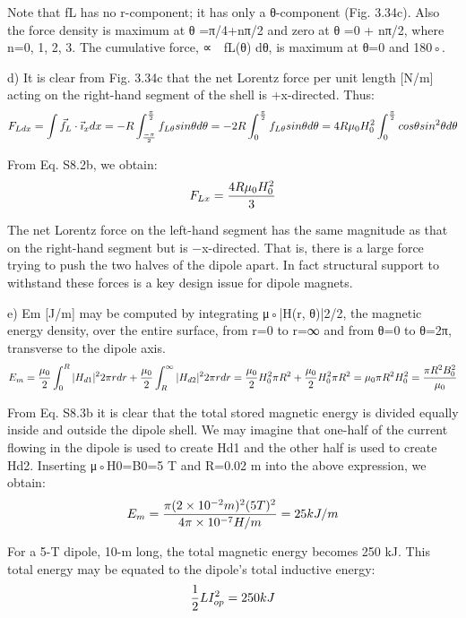 Note that fL has no r-component; it has only a θ-component (Fig. 3.34c). Also
the force density is maximum at θ =π/4+nπ/2 and zero at θ =0 + nπ/2, where
n=0, 1, 2, 3. The cumulative force, ∝  fL(θ) dθ, is maximum at θ=0 and 180◦.

d) It is clear from Fig. 3.34c that the net Lorentz force per unit length [N/m]
acting on the right-hand segment of the shell is +x-directed. Thus:
$$
F_{Ldx}=\int\vec{f}_{L}\cdot\vec{\imath}_{x}dx=-R\int_{\frac{-\pi}{2}}^{\frac{\pi}{2}}f_{L\theta}sin\theta d\theta\\%
=-2R\int_{0}^{\frac{\pi}{2}}f_{L\theta}sin\theta d\theta=4R\mu_{0}H_{0}^{2}\int_{0}^{\frac{\pi}{2}}cos\theta sin^{2}\theta d\theta\\%
$$

From Eq. S8.2b, we obtain:
$$
F_{Lx}=\frac{4R\mu_{0}H_{0}^{2}}{3}\\%
$$

The net Lorentz force on the left-hand segment has the same magnitude as that
on the right-hand segment but is −x-directed. That is, there is a large force trying
to push the two halves of the dipole apart. In fact structural support to withstand
these forces is a key design issue for dipole magnets.

e) Em [J/m] may be computed by integrating μ◦|H(r, θ)|2/2, the magnetic energy density, over the entire surface, from r=0 to r=∞ and from θ=0 to θ=2π,
transverse to the dipole axis.
$$
E_{m}=\frac{\mu_{0}}{2}\int_{0}^{R}|H_{d1}|^{2}2\pi rdr+\frac{\mu_{0}}{2}\int_{R}^{\infty}|H_{d2}|^{2}2\pi rdr\\%
=\frac{\mu_{0}}{2}H_{0}^{2}\pi R^{2}+\frac{\mu_{0}}{2}H_{0}^{2}\pi R^{2}\\%
=\mu_{0}\pi R^{2}H_{0}^{2}=\frac{\pi R^{2}B_{0}^{2}}{\mu_{0}}\\%
$$

From Eq. S8.3b it is clear that the total stored magnetic energy is divided equally
inside and outside the dipole shell. We may imagine that one-half of the current
flowing in the dipole is used to create Hd1 and the other half is used to create Hd2.
Inserting μ◦H0=B0=5 T and R=0.02 m into the above expression, we obtain:
$$
E_{m}=\frac{\pi(2\times 10^{-2}m)^{2}(5T)^{2}}{4\pi\times10^{-7}H/m}=25kJ/m\\
$$

For a 5-T dipole, 10-m long, the total magnetic energy becomes 250 kJ. This total
energy may be equated to the dipole’s total inductive energy:
$$
\frac{1}{2}LI_{op}^{2}=250kJ\\%
$$

